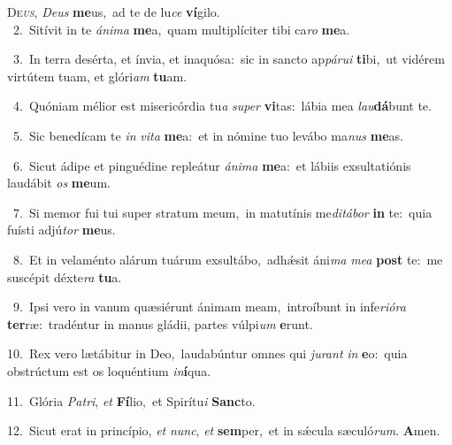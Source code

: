 \lettrine{\initial\textcolor{\initialcolor}{D}}{e\-\textit{us}\-,} \textit{De}\-\textit{us} \textbf{me}\-us,~\star ad te de lu\textit{ce} \textbf{ví}\-gilo.\\
{\numbfont\textcolor{\numbcolor}{~2.}}~Sitívit in te \textit{á}\-\textit{ni}\textit{ma} \textbf{me}\-a,~\star quam multiplíciter tibi ca\textit{ro} \textbf{me}\-a.\par
{\numbfont\textcolor{\numbcolor}{~3.}}~In terra desérta, et ínvia, et inaquósa:~\dagger sic in sancto ap\-\textit{pá}\-\textit{ru}\textit{i} \textbf{ti}\-bi,~\star ut vidérem virtútem tuam, et glóri\textit{am} \textbf{tu}\-am.\par
{\numbfont\textcolor{\numbcolor}{~4.}}~Quóniam mélior est misericórdia tu\textit{a} \textit{su}\-\textit{per} \textbf{vi}\-tas:~\star lábia mea \textit{lau}\-\textbf{dá}bunt te.\par
{\numbfont\textcolor{\numbcolor}{~5.}}~Sic benedícam te \textit{in} \textit{vi}\-\textit{ta} \textbf{me}\-a:~\star et in nómine tuo levábo ma\textit{nus} \textbf{me}\-as.\par
{\numbfont\textcolor{\numbcolor}{~6.}}~Sicut ádipe et pinguédine repleátur \textit{á}\-\textit{ni}\textit{ma} \textbf{me}\-a:~\star et lábiis exsultatiónis laudábit \textit{os} \textbf{me}\-um.\par
{\numbfont\textcolor{\numbcolor}{~7.}}~Si memor fui tui super stratum meum,~\dagger in matutínis me\-\textit{di}\-\textit{tá}\textit{bor} \textbf{in} te:~\star quia fuísti adjú\textit{tor} \textbf{me}\-us.\par
{\numbfont\textcolor{\numbcolor}{~8.}}~Et in velaménto alárum tuárum exsultábo,~\dagger adhǽsit áni\textit{ma} \textit{me}\-\textit{a} \textbf{post} te:~\star me suscépit déxte\textit{ra} \textbf{tu}\-a.\par
{\numbfont\textcolor{\numbcolor}{~9.}}~Ipsi vero in vanum quæsiérunt ánimam meam,~\dagger introíbunt in infe\-\textit{ri}\-\textit{ó}\textit{ra} \textbf{ter}\-ræ:~\star tradéntur in manus gládii, partes vúlpi\textit{um} \textbf{e}\-runt.\par
{\numbfont\textcolor{\numbcolor}{10.}}~Rex vero lætábitur in Deo,~\dagger laudabúntur omnes qui \textit{ju}\-\textit{rant} \textit{in} \textbf{e}\-o:~\star quia obstrúctum est os loquéntium \textit{in}\-\textbf{í}qua.\par
{\numbfont\textcolor{\numbcolor}{11.}}~Glória \textit{Pa}\-\textit{tri}, \textit{et} \textbf{Fí}\-lio,~\star et Spirítu\textit{i} \textbf{Sanc}\-to.\par
{\numbfont\textcolor{\numbcolor}{12.}}~Sicut erat in princípio, \textit{et} \textit{nunc}\-, \textit{et} \textbf{sem}\-per,~\star et in sǽcula sæculó\-\textit{rum}\-. \textbf{A}\-men.\par
